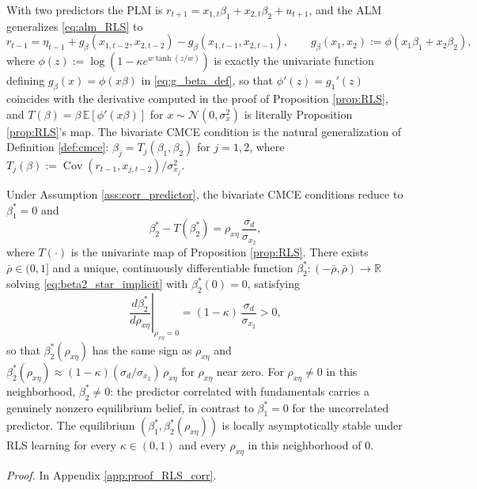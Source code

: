 With two predictors the PLM is $r_{t+1}=x_{1,t}\beta_1+x_{2,t}\beta_2+u_{t+1}$, and the ALM generalizes \eqref{eq:alm_RLS} to
\begin{equation}\label{eq:alm_bivariate}
r_{t-1}=\eta_{t-1}+g_\beta(x_{1,t-2},x_{2,t-2})-g_\beta(x_{1,t-1},x_{2,t-1}), \qquad g_\beta(x_1,x_2):=\phi(x_1\beta_1+x_2\beta_2),
\end{equation}
where $\phi(z):=\log(1-\kappa e^{w\tanh(z/w)})$ is exactly the univariate function defining $g_\beta(x)=\phi(x\beta)$ in \eqref{eq:g_beta_def}, so that $\phi'(z)=g_1'(z)$ coincides with the derivative computed in the proof of Proposition \ref{prop:RLS}, and $T(\beta)=\beta\,\mathbb E[\phi'(x\beta)]$ for $x\sim\mathcal N(0,\sigma_x^2)$ is literally Proposition \ref{prop:RLS}'s map. The bivariate CMCE condition is the natural generalization of Definition \ref{def:cmce}: $\beta_j=T_j(\beta_1,\beta_2)$ for $j=1,2$, where $T_j(\beta):=\operatorname{Cov}(r_{t-1},x_{j,t-2})/\sigma_{x_j}^2$.

\begin{proposition}\label{prop:corr_equilibrium}
Under Assumption \ref{ass:corr_predictor}, the bivariate CMCE conditions reduce to $\beta_1^*=0$ and
\begin{equation}\label{eq:beta2_star_implicit}
\beta_2^* - T(\beta_2^*) = \rho_{x\eta}\,\frac{\sigma_d}{\sigma_{x_2}},
\end{equation}
where $T(\cdot)$ is the univariate map of Proposition \ref{prop:RLS}. There exists $\bar\rho\in(0,1]$ and a unique, continuously differentiable function $\beta_2^*:(-\bar\rho,\bar\rho)\to\mathbb R$ solving \eqref{eq:beta2_star_implicit} with $\beta_2^*(0)=0$, satisfying
\begin{equation}\label{eq:beta2_star_deriv}
\left.\frac{d\beta_2^*}{d\rho_{x\eta}}\right|_{\rho_{x\eta}=0} = (1-\kappa)\,\frac{\sigma_d}{\sigma_{x_2}} > 0,
\end{equation}
so that $\beta_2^*(\rho_{x\eta})$ has the same sign as $\rho_{x\eta}$ and $\beta_2^*(\rho_{x\eta})\approx(1-\kappa)(\sigma_d/\sigma_{x_2})\,\rho_{x\eta}$ for $\rho_{x\eta}$ near zero. For $\rho_{x\eta}\neq 0$ in this neighborhood, $\beta_2^*\neq0$: the predictor correlated with fundamentals carries a genuinely nonzero equilibrium belief, in contrast to $\beta_1^*=0$ for the uncorrelated predictor. The equilibrium $(\beta_1^*,\beta_2^*(\rho_{x\eta}))$ is locally asymptotically stable under RLS learning for every $\kappa\in(0,1)$ and every $\rho_{x\eta}$ in this neighborhood of $0$.
\end{proposition}
\textit{Proof.} In Appendix \ref{app:proof_RLS_corr}.

